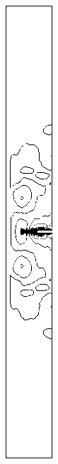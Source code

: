 \begin{figure}[h]
\begin{subfigure}[b]{0.13\textwidth}
\caption{ }
\end{subfigure}
\begin{subfigure}[b]{0.13\textwidth}
\centering
\includegraphics[width=\textwidth]{png/cranium/2d-sxx-single-comp-02.png}

\end{subfigure}
\end{figure}
